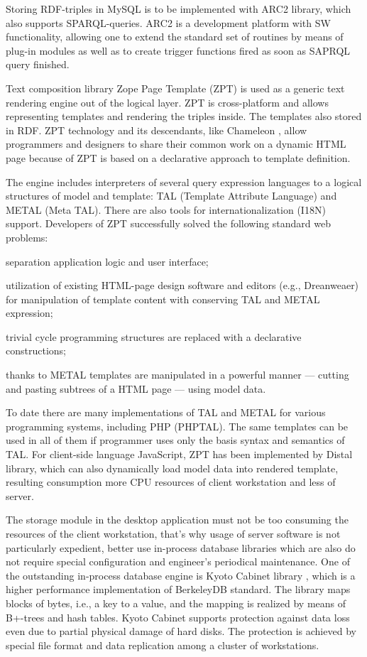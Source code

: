 \documentclass[conference]{IEEEtran}
\begin{document}
Storing RDF-triples in MySQL is to be implemented with ARC2 library,
which also supports SPARQL-queries.  ARC2 is a development platform
with SW functionality, allowing one to extend the standard set of
routines by means of plug-in modules as well as to create trigger
functions fired as soon as SAPRQL query finished.

Text composition library Zope Page Template (ZPT) is used as a generic
text rendering engine out of the logical layer.  ZPT is cross-platform
and allows representing templates and rendering the triples inside.
The templates also stored in RDF.  ZPT technology and its descendants,
like Chameleon \cite{cham}, allow programmers and designers to share their common
work on a dynamic HTML page because of ZPT is based on a declarative
approach to template definition.

The engine includes interpreters of several query expression languages
to a logical structures of model and template: TAL (Template Attribute
Language) and METAL (Meta TAL).  There are also tools for
internationalization (I18N) support.  Developers of ZPT successfully
solved the following standard web problems:
\begin{IEEEitemize}
\item separation application logic and user interface;
\item utilization of existing HTML-page design software and editors
  (e.g., Dreanweaer) for manipulation of template content with
  conserving TAL and METAL expression;
\item trivial cycle programming structures are replaced with a
  declarative constructions;
\item thanks to METAL templates are manipulated in a powerful manner
  --- cutting and pasting subtrees of a HTML page --- using model data.
\end{IEEEitemize}

To date there are many implementations of TAL and METAL for various
programming systems, including PHP (PHPTAL).  The same templates can
be used in all of them if programmer uses only the basis syntax and
semantics of TAL.  For client-side language JavaScript, ZPT has been
implemented by Distal library, which can also dynamically load model
data into rendered template, resulting consumption more CPU resources
of client workstation and less of server.

The storage module in the desktop application must not be too
consuming the resources of the client workstation, that's why usage of
server software is not particularly expedient, better use in-process
database libraries which are also do not require special configuration
and engineer's periodical maintenance.  One of the outstanding
in-process database engine is Kyoto Cabinet library \cite{kiyoto},
which is a higher performance implementation of BerkeleyDB standard.
The library maps blocks of bytes, i.e., a key to a value, and the
mapping is realized by means of B+-trees and hash tables.  Kyoto
Cabinet supports protection against data loss even due to partial
physical damage of hard disks.  The protection is achieved by special
file format and data replication among a cluster of workstations.
\end{document}
